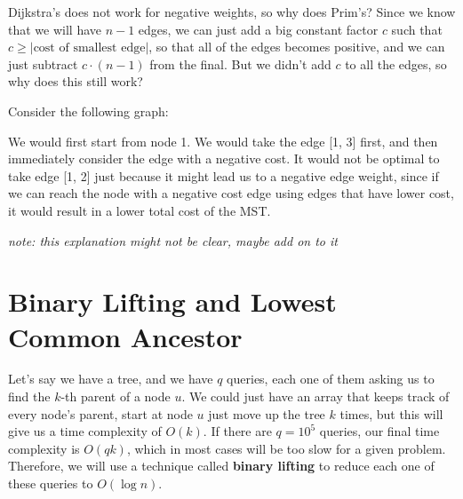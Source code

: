 \documentclass{article}
\begin{document}
Dijkstra's does not work for negative weights, so why does Prim's? Since we know that we will have $n - 1$ edges, we can just add a big constant factor $c$ such that $c \geq \lvert \text{cost of smallest edge} \rvert$, so that all of the edges becomes positive, and we can just subtract $c \cdot (n - 1)$ from the final. But we didn't add $c$ to all the edges, so why does this still work?

Consider the following graph:
\begin{center}
 \end{center}
 
 We would first start from node 1. We would take the edge [1, 3] first, and then immediately consider the edge with a negative cost. It would not be optimal to take edge [1, 2] just because it might lead us to a negative edge weight, since if we can reach the node with a negative cost edge using edges that have lower cost, it would result in a lower total cost of the MST.
 
 \textit{note: this explanation might not be clear, maybe add on to it}

\section{Binary Lifting and Lowest Common Ancestor}
Let's say we have a tree, and we have $q$ queries, each one of them asking us to find the $k$-th parent of a node $u$. We could just have an array that keeps track of every node's parent, start at node $u$ just move up the tree $k$ times, but this will give us a time complexity of $O(k)$. If there are $q = 10^5$ queries, our final time complexity is $O(qk)$, which in most cases will be too slow for a given problem. Therefore, we will use a technique called \textbf{binary lifting} to reduce each one of these queries to $O(\log n)$.
\end{document}
